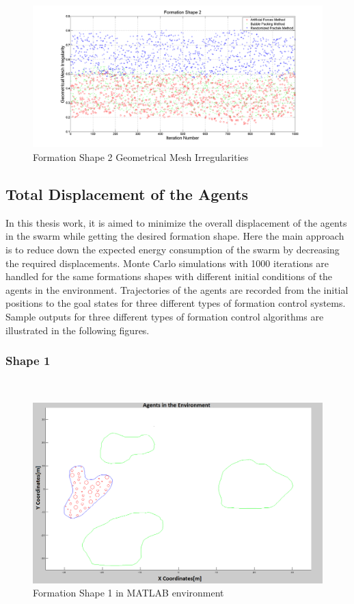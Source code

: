 \begin{figure}[H]
\caption{Formation Shape 2 Geometrical Mesh Irregularities} \label{geometric_ref_2}
\centerline{\includegraphics[scale = 0.35]{Geometrical_Irr_2}}
\end{figure} 	
		
\subsection{Total Displacement of the Agents}  \label{total_dist_ref}
		
In this thesis work, it is aimed to minimize the overall displacement of the agents in the swarm while getting the desired formation shape. Here the main approach is to reduce down the expected energy consumption of the swarm by decreasing the required displacements. Monte Carlo simulations with 1000 iterations are handled for the same formations shapes with different initial conditions of the agents in the environment. Trajectories of the agents are recorded from the initial positions to the goal states for three different types of formation control systems. Sample outputs for three different types of formation control algorithms are illustrated in the following figures.
		
\subsubsection{Shape 1}\hspace{0pt} \\
		
\begin{figure}[H]
\caption{Formation Shape 1 in MATLAB environment}
\centerline{\includegraphics[scale = 0.32]{Trajectories_Formation_Shape_1_2}}
\end{figure} 	
			
